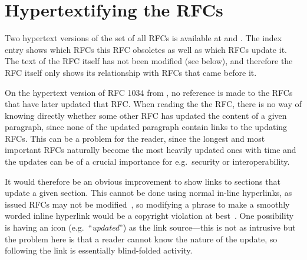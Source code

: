 \section{Hypertextifying the RFCs}

Two hypertext versions of the set of all RFCs is available at
\cite{rfc-index-faqs} and \cite{armwar_rfc_hyper_archiv}.  
The index entry shows which RFCs this RFC obsoletes as well as which
RFCs update it.  The text of the RFC itself has not been modified (see
below), and therefore the RFC itself only shows its relationship with
RFCs that came before it.



On the hypertext version of RFC 1034 from \cite{rfc-index-faqs}, no
reference is made to the RFCs that have later updated that RFC.  When
reading the the RFC, there is no way of knowing directly whether some
other RFC has updated the content of a given paragraph, since none of
the updated paragraph contain links to the updating RFCs.  This can be
a problem for the reader, since the longest and most important RFCs
naturally become the most heavily updated ones with time and the
updates can be of a crucial importance for e.g.~security or
interoperability.

It would therefore be an obvious
improvement to show links to sections that
update a given section. This cannot be done using normal in-line 
hyperlinks, as
issued RFCs may not be
modified~\cite{rfc-intro}, so
modifying a phrase to make a
smoothly worded inline hyperlink would be a copyright violation at
best~\cite{rfc-authoring}.  
One possibility is having an icon
(e.g.~``\emph{updated}'') as the link
source---this is not as
intrusive but the problem here is that a reader cannot know the nature
of the update, so following the link is essentially blind-folded
activity.  


